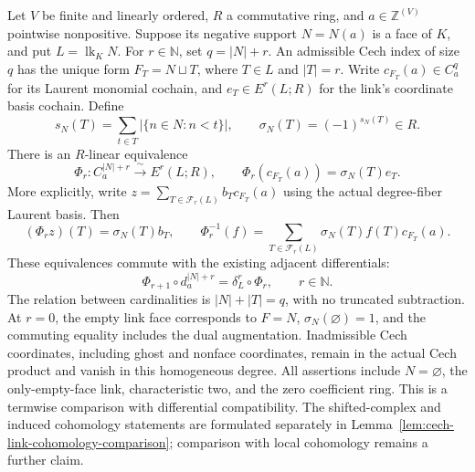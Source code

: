 \begin{lemma}\label{lem:cech-link-coordinate-comparison}
\leanok
Let $V$ be finite and linearly ordered, $R$ a commutative ring, and
$a\in\mathbb Z^{(V)}$ pointwise nonpositive. Suppose its negative support
$N=N(a)$ is a face of $K$, and put $L=\operatorname{lk}_K N$.
For $r\in\mathbb N$, set $q=|N|+r$. An admissible Cech index of size
$q$ has the unique form $F_T=N\sqcup T$, where $T\in L$ and $|T|=r$.
Write $c_{F_T}(a)\in C^q_a$ for its Laurent monomial cochain, and
$e_T\in E^r(L;R)$ for the link's coordinate basis cochain. Define
\[
 s_N(T)=\sum_{t\in T}|\{n\in N:n<t\}|,\qquad
 \sigma_N(T)=(-1)^{s_N(T)}\in R.
\]
There is an $R$-linear equivalence
\[
 \Phi_r:C^{|N|+r}_a\xrightarrow{\ \sim\ }E^r(L;R),
 \qquad
 \Phi_r(c_{F_T}(a))=\sigma_N(T)e_T.
\]
More explicitly, write $z=\sum_{T\in\mathcal F_r(L)}
b_Tc_{F_T}(a)$ using the actual degree-fiber Laurent basis. Then
\[
 (\Phi_r z)(T)=\sigma_N(T)b_T,\qquad
 \Phi_r^{-1}(f)=
 \sum_{T\in\mathcal F_r(L)}\sigma_N(T)f(T)c_{F_T}(a).
\]
These equivalences commute with the existing adjacent differentials:
\[
 \Phi_{r+1}\circ d_a^{|N|+r}
   =\delta_L^r\circ\Phi_r,\qquad r\in\mathbb N.
\]
The relation between cardinalities is $|N|+|T|=q$, with no truncated
subtraction. At $r=0$, the empty link face corresponds to $F=N$,
$\sigma_N(\varnothing)=1$, and the commuting equality includes the
dual augmentation. Inadmissible Cech coordinates, including ghost and
nonface coordinates, remain in the actual Cech product and vanish in
this homogeneous degree. All assertions include $N=\varnothing$,
the only-empty-face link, characteristic two, and the zero coefficient
ring. This is a termwise comparison with differential compatibility.
The shifted-complex and induced cohomology statements are formulated
separately in Lemma~\ref{lem:cech-link-cohomology-comparison}; comparison
with local cohomology remains a further claim.
\end{lemma}
